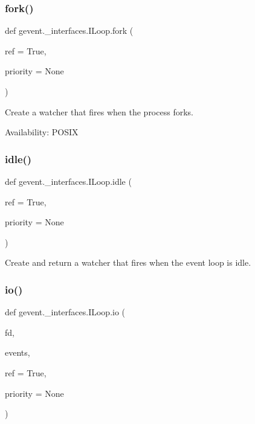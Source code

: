 \subsubsection{\texorpdfstring{fork()}{fork()}}
{\footnotesize\ttfamily def gevent.\+\_\+interfaces.\+I\+Loop.\+fork (\begin{DoxyParamCaption}\item[{}]{ref = {\ttfamily True},  }\item[{}]{priority = {\ttfamily None} }\end{DoxyParamCaption})}

\begin{DoxyVerb}Create a watcher that fires when the process forks.

Availability: POSIX
\end{DoxyVerb}
 \mbox{\label{classgevent_1_1__interfaces_1_1_i_loop_a7f29887a9b79a854c5631ac347e3d3bc}} 
\subsubsection{\texorpdfstring{idle()}{idle()}}
{\footnotesize\ttfamily def gevent.\+\_\+interfaces.\+I\+Loop.\+idle (\begin{DoxyParamCaption}\item[{}]{ref = {\ttfamily True},  }\item[{}]{priority = {\ttfamily None} }\end{DoxyParamCaption})}

\begin{DoxyVerb}Create and return a watcher that fires when the event loop is idle.
\end{DoxyVerb}
 \mbox{\label{classgevent_1_1__interfaces_1_1_i_loop_a223a81b01db7e75e1bbf4f0113e30f5b}} 
\subsubsection{\texorpdfstring{io()}{io()}}
{\footnotesize\ttfamily def gevent.\+\_\+interfaces.\+I\+Loop.\+io (\begin{DoxyParamCaption}\item[{}]{fd,  }\item[{}]{events,  }\item[{}]{ref = {\ttfamily True},  }\item[{}]{priority = {\ttfamily None} }\end{DoxyParamCaption})}

